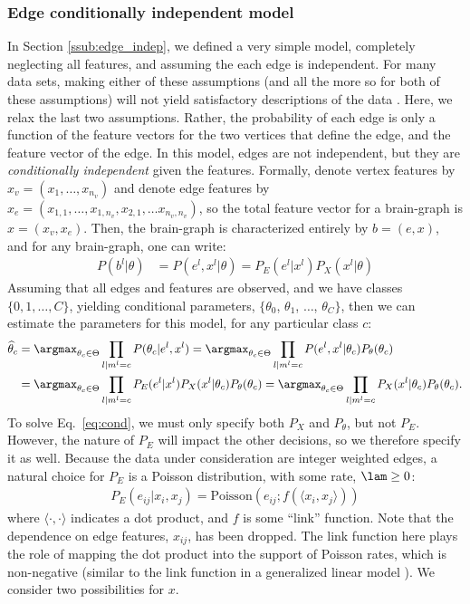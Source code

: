 \subsubsection{Edge conditionally independent model} %
\label{ssub:edge_cond}


In Section \ref{ssub:edge_indep}, we defined a very simple model, completely neglecting all features, and assuming the each edge is independent.  For many data sets, making either of these assumptions (and all the more so for both of these assumptions) will not yield satisfactory descriptions of the data \cite{?}.  Here, we relax the last two assumptions.  Rather, the probability of each edge is only a function of the feature vectors for the two vertices that define the edge, and the feature vector of the edge.  In this model, edges are not independent, but they are \emph{conditionally independent} given the features.   Formally, denote vertex features by $x_v=(x_1, \ldots, x_{n_v})$ and denote edge features by $x_e=(x_{1,1}, \ldots, x_{1,n_v}, x_{2,1}, \ldots x_{n_v,n_v})$, so the total feature vector for a brain-graph is $x=(x_v, x_e)$.  Then, the brain-graph is characterized entirely by $b=(e,x)$, and for any brain-graph, one can write:
\begin{align}
	P(b^l | \theta) &= P(e^l, x^l | \theta) = P_E(e^l | x^l) P_X(x^l | \theta) 
\end{align}
Assuming that all edges and features are observed, and we have classes $\{0,1,\ldots,C\}$, yielding conditional parameters, $\{\theta_0$, $\theta_1$, $\ldots$, $\theta_C\}$, then we can estimate the parameters for this model, for any particular class $c$:
\begin{align}
\widehat{\theta}_c 	&= \argmax_{\theta_c \in \Theta} \prod_{l | m^l=c} P(\theta_c | e^l, x^l) %
		= \argmax_{\theta_c \in \Theta} \prod_{l | m^l=c} P(e^l, x^l | \theta_c) P_{\theta}(\theta_c) \nonumber \\
		&= \argmax_{\theta_c \in \Theta} \prod_{l | m^l=c} P_E(e^l | x^l) P_X(x^l | \theta_c) P_{\theta}(\theta_c) 					 					
		= \argmax_{\theta_c \in \Theta} \prod_{l | m^l=c}  P_X(x^l | \theta_c) P_{\theta}(\theta_c).  \label{eq:cond}
\end{align}
To solve Eq.~\ref{eq:cond}, we must only specify both $P_X$ and $P_{\theta}$, but not $P_E$.  However, the nature of $P_E$ will impact the other decisions, so we therefore specify it as well.  Because the data under consideration are integer weighted edges, a natural choice for $P_E$ is a Poisson distribution, with some rate, $\lam \geq 0$:
\begin{align} \label{eq:E}
	P_E(e_{ij} | x_i,x_j) = \text{Poisson}(e_{ij}; f(\langle x_i, x_j \rangle))
\end{align}
where $\langle \cdot, \cdot \rangle$ indicates a dot product, and $f$ is some ``link'' function.  Note that the dependence on edge features, $x_{ij}$, has been dropped.  The link function here plays the role of mapping the dot product into the support of Poisson rates, which is non-negative (similar to the link function in a generalized linear model \cite{McCullaghNelder89}).  We consider two possibilities for $x$.

